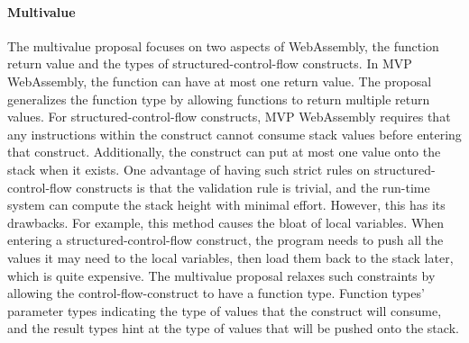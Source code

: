 \paragraph{Multivalue}
The multivalue proposal focuses on two aspects of WebAssembly, the function return value and the types of structured-control-flow constructs. In MVP WebAssembly, the function can have at most one return value. The proposal generalizes the function type by allowing functions to return multiple return values. For structured-control-flow constructs, MVP WebAssembly requires that any instructions within the construct cannot consume stack values before entering that construct. Additionally, the construct can put at most one value onto the stack when it exists. One advantage of having such strict rules on structured-control-flow constructs is that the validation rule is trivial, and the run-time system can compute the stack height with minimal effort. However, this has its drawbacks. For example, this method causes the bloat of local variables. When entering a structured-control-flow construct, the program needs to push all the values it may need to the local variables, then load them back to the stack later, which is quite expensive. The multivalue proposal relaxes such constraints by allowing the control-flow-construct to have a function type. Function types' parameter types indicating the type of values that the construct will consume, and the result types hint at the type of values that will be pushed onto the stack. 

